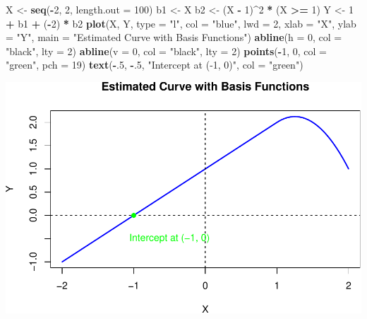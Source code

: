 \documentclass[
]{article}
\newenvironment{Shaded}{\begin{snugshade}}{\end{snugshade}}
\newcommand{\AttributeTok}[1]{\textcolor[rgb]{0.13,0.29,0.53}{#1}}
\newcommand{\DecValTok}[1]{\textcolor[rgb]{0.00,0.00,0.81}{#1}}
\newcommand{\FunctionTok}[1]{\textcolor[rgb]{0.13,0.29,0.53}{\textbf{#1}}}
\newcommand{\NormalTok}[1]{#1}
\newcommand{\OtherTok}[1]{\textcolor[rgb]{0.56,0.35,0.01}{#1}}
\newcommand{\SpecialCharTok}[1]{\textcolor[rgb]{0.81,0.36,0.00}{\textbf{#1}}}
\newcommand{\StringTok}[1]{\textcolor[rgb]{0.31,0.60,0.02}{#1}}
\begin{document}
\begin{Shaded}
\begin{Highlighting}[]
\NormalTok{X }\OtherTok{\textless{}{-}} \FunctionTok{seq}\NormalTok{(}\SpecialCharTok{{-}}\DecValTok{2}\NormalTok{, }\DecValTok{2}\NormalTok{, }\AttributeTok{length.out =} \DecValTok{100}\NormalTok{)}
\NormalTok{b1 }\OtherTok{\textless{}{-}}\NormalTok{ X}
\NormalTok{b2 }\OtherTok{\textless{}{-}}\NormalTok{ (X }\SpecialCharTok{{-}} \DecValTok{1}\NormalTok{)}\SpecialCharTok{\^{}}\DecValTok{2} \SpecialCharTok{*}\NormalTok{ (X }\SpecialCharTok{\textgreater{}=} \DecValTok{1}\NormalTok{)}
\NormalTok{Y }\OtherTok{\textless{}{-}} \DecValTok{1} \SpecialCharTok{+}\NormalTok{ b1 }\SpecialCharTok{+}\NormalTok{ (}\SpecialCharTok{{-}}\DecValTok{2}\NormalTok{) }\SpecialCharTok{*}\NormalTok{ b2}
\FunctionTok{plot}\NormalTok{(X, Y, }\AttributeTok{type =} \StringTok{"l"}\NormalTok{, }\AttributeTok{col =} \StringTok{"blue"}\NormalTok{, }\AttributeTok{lwd =} \DecValTok{2}\NormalTok{, }\AttributeTok{xlab =} \StringTok{"X"}\NormalTok{, }\AttributeTok{ylab =} \StringTok{"Y"}\NormalTok{,}
     \AttributeTok{main =} \StringTok{"Estimated Curve with Basis Functions"}\NormalTok{)}
\FunctionTok{abline}\NormalTok{(}\AttributeTok{h =} \DecValTok{0}\NormalTok{, }\AttributeTok{col =} \StringTok{"black"}\NormalTok{, }\AttributeTok{lty =} \DecValTok{2}\NormalTok{)}
\FunctionTok{abline}\NormalTok{(}\AttributeTok{v =} \DecValTok{0}\NormalTok{, }\AttributeTok{col =} \StringTok{"black"}\NormalTok{, }\AttributeTok{lty =} \DecValTok{2}\NormalTok{)}
\FunctionTok{points}\NormalTok{(}\SpecialCharTok{{-}}\DecValTok{1}\NormalTok{, }\DecValTok{0}\NormalTok{, }\AttributeTok{col =} \StringTok{"green"}\NormalTok{, }\AttributeTok{pch =} \DecValTok{19}\NormalTok{)}
\FunctionTok{text}\NormalTok{(}\SpecialCharTok{{-}}\NormalTok{.}\DecValTok{5}\NormalTok{, }\SpecialCharTok{{-}}\NormalTok{.}\DecValTok{5}\NormalTok{, }\StringTok{"Intercept at ({-}1, 0)"}\NormalTok{, }\AttributeTok{col =} \StringTok{"green"}\NormalTok{)}
\end{Highlighting}
\end{Shaded}

\includegraphics{chapter-07-hw_files/figure-latex/unnamed-chunk-1-1.pdf}
\end{document}
